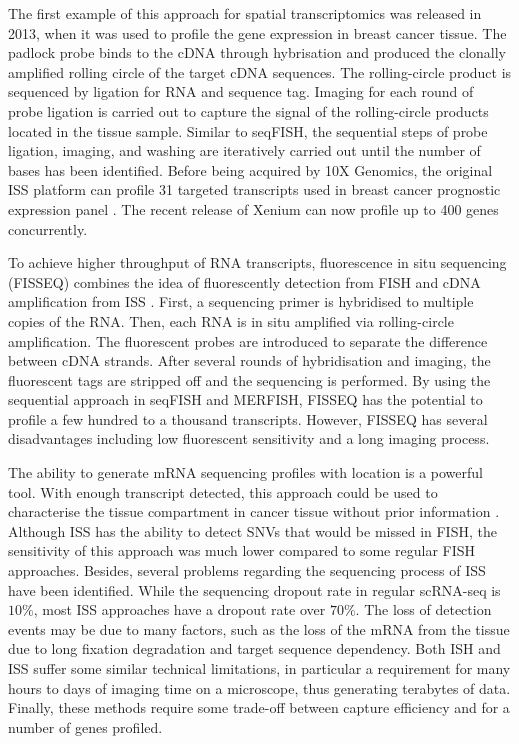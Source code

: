 The first example of this approach for spatial transcriptomics was released in 2013, when it was used to profile the gene expression in breast cancer tissue. The padlock probe binds to the cDNA through hybrisation and produced the  clonally amplified rolling circle of the target cDNA sequences. The rolling-circle product is sequenced by ligation for RNA and sequence tag. Imaging for each round of probe ligation is carried out to capture the signal of the rolling-circle products located in the tissue sample. Similar to seqFISH, the sequential steps of probe ligation, imaging, and washing are iteratively carried out until the number of bases has been identified. Before being acquired by 10X Genomics, the original ISS platform can profile 31 targeted transcripts used in breast cancer prognostic expression panel \cite{ke2013situ}. The recent release of Xenium can now profile up to 400 genes concurrently. 

To achieve higher throughput of RNA transcripts, fluorescence in situ sequencing (FISSEQ) combines the idea of fluorescently detection from FISH and cDNA amplification from ISS \cite{lee2015fluorescent}. First, a sequencing primer is hybridised to multiple copies of the RNA. Then, each RNA is in situ amplified via rolling-circle amplification. The fluorescent probes are introduced to separate the difference between cDNA strands. After several rounds of hybridisation and imaging, the fluorescent tags are stripped off and the sequencing is performed. By using the sequential approach in seqFISH and MERFISH, FISSEQ has the potential to profile a few hundred to a thousand transcripts. However, FISSEQ has several disadvantages including low fluorescent sensitivity and a long imaging process.  

The ability to generate mRNA sequencing profiles with location is a powerful tool. With enough transcript detected, this approach could be used to characterise the tissue compartment in cancer tissue without prior information  \cite{ke2013situ}. Although ISS has the ability to detect SNVs that would be missed in FISH, the sensitivity of this approach was much lower compared to some regular FISH approaches. Besides, several problems regarding the sequencing process of ISS have been identified. While the sequencing dropout rate in regular scRNA-seq is $10\%$, most ISS approaches have a dropout rate over $70\%$. The loss of detection events may be due to many factors, such as the loss of the
mRNA from the tissue due to long fixation degradation and target sequence dependency. Both ISH and ISS suffer some similar technical limitations, in particular a requirement for many hours to days of imaging time on a microscope, thus generating terabytes of data. Finally, these methods require some trade-off between capture efficiency and for a number of genes profiled. 

